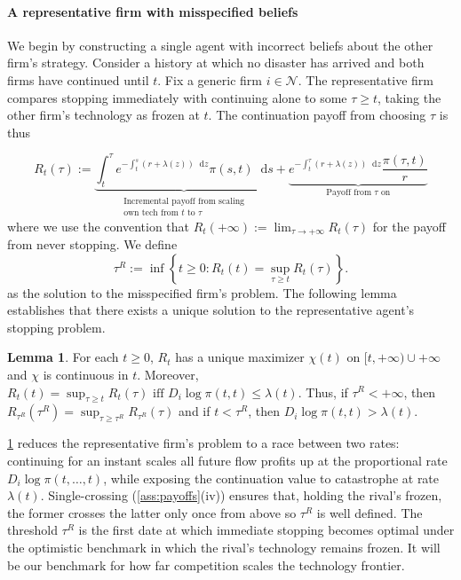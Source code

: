 \documentclass[12pt,reqno]{article}
\newcommand{\de}{\mathop{}\!\mathrm{d}}
\theoremstyle{definition} \newtheorem{example}{Example}
\theoremstyle{definition} \newtheorem{condition}{Condition}
\theoremstyle{definition} \newtheorem{corollary}{Corollary}
\theoremstyle{definition} \newtheorem{claim}{Claim}
\theoremstyle{definition} \newtheorem{definition}{Definition}
\theoremstyle{definition} \newtheorem{conjecture}{Conjecture}
\theoremstyle{definition} \newtheorem{Lemma}{Lemma}
\theoremstyle{definition} \newtheorem{lemma}{Lemma}
\theoremstyle{plain} \newtheorem{theorem}{Theorem}
\theoremstyle{definition} \newtheorem{assumption}{Assumption}
\theoremstyle{definition} \newtheorem*{assumptionnonumber}{Assumption}
\theoremstyle{definition} \newtheorem*{theoremNoNumber}{Proposition}
\theoremstyle{definition}
\theoremstyle{definition}\newtheorem{proposition}{Proposition}
\theoremstyle{definition} \newtheorem{result}{Result}
\theoremstyle{definition} \newtheorem*{definitionNoNumber}{Definition}
\theoremstyle{definition} \newtheorem{Definition}{Definition}
\theoremstyle{definition} \newtheorem*{DefinitionNoNumber}{Definition}
\theoremstyle{definition} \newtheorem*{fact}{Fact}
\theoremstyle{definition} \newtheorem*{property}{Property}
\theoremstyle{definition} \newtheorem{remark}{Remark}
\begin{document}
\paragraph{A representative firm with misspecified beliefs} We begin by constructing a single agent with incorrect beliefs about the other firm's strategy. Consider a history at which no disaster has arrived and both firms have continued until $t$. Fix a generic firm $i\in\mathcal N$. The representative firm compares stopping immediately with continuing alone to some $\tau\geq t$, taking the other firm's technology as frozen at $t$. The continuation payoff from choosing $\tau$ is thus

\[
R_t(\tau)
:=
\underbrace{\int^\tau_t e^{-\int^s_t (r+\lambda(z))\de z}\pi(s,t)\de s}_{\substack{\text{Incremental payoff from scaling} \\ \text{own tech from $t$ to $\tau$}}}
+
\underbrace{e^{-\int^\tau_t (r+\lambda(z))\de z}\frac{\pi(\tau,t)}{r}}_{\text{Payoff from $\tau$ on}}
\]
where we use the convention that 
$R_t(+\infty)
:=
\lim_{\tau\to+\infty}R_t(\tau)$  for the payoff from never stopping. We define 
\[
\tau^R
:=
\inf\left\{
t\geq 0:
R_t(t)
=
\sup_{\tau\geq t} R_t(\tau)
\right\}.
\]
as the solution to the misspecified firm's problem. The following lemma establishes that there exists a unique solution to the representative agent's stopping problem. 

\begin{lemma}\label{lem:R-single-peaked}
For each $t\geq 0$, $R_t$ has a unique maximizer $\chi(t)$ on $[t,+\infty) \cup +\infty$ and $\chi$ is continuous in $t$. Moreover,
$
R_t(t)=\sup_{\tau\geq t}R_t(\tau) \text{ iff }
D_i\log\pi(t,t)\leq\lambda(t).$ 
Thus, if $\tau^R<+\infty$, then
$
R_{\tau^R}(\tau^R)=\sup_{\tau\geq \tau^R}R_{\tau^R}(\tau)$  and if $t<\tau^R$, then $D_i\log\pi(t,t)>\lambda(t)$.
\end{lemma}

\cref{lem:R-single-peaked} reduces the representative firm's problem to a race between two rates: continuing for an instant scales all future flow profits up at the proportional rate $D_i\log\pi(t,\ldots,t)$, while exposing the  continuation value to catastrophe at rate $\lambda(t)$. Single-crossing (\cref{ass:payoffs}(iv)) ensures that, holding the rival's frozen, the former crosses the latter only once from above so $\tau^R$ is well defined. The threshold $\tau^R$ is the first date at which immediate stopping becomes optimal under the optimistic benchmark in which the rival's technology remains frozen. It will be our benchmark for how far competition scales the technology frontier.
\end{document}

